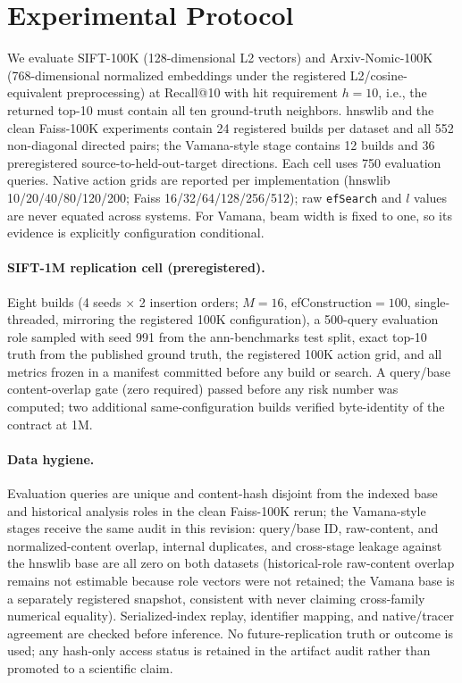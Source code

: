 \documentclass{article}
\begin{document}
\section{Experimental Protocol}
\label{sec:protocol}

We evaluate SIFT-100K (128-dimensional L2 vectors) and Arxiv-Nomic-100K (768-dimensional normalized
embeddings under the registered L2/cosine-equivalent preprocessing) at Recall@10 with hit requirement
$h=10$, i.e., the returned top-10 must contain all ten ground-truth neighbors. hnswlib and the clean
Faiss-100K experiments contain 24 registered builds per dataset and all 552 non-diagonal directed pairs;
the Vamana-style stage contains 12 builds and 36 preregistered source-to-held-out-target directions. Each
cell uses 750 evaluation queries. Native action grids are reported per implementation (hnswlib
10/20/40/80/120/200; Faiss 16/32/64/128/256/512); raw \texttt{efSearch} and $l$ values are never equated
across systems. For Vamana, beam width is fixed to one, so its evidence is explicitly configuration
conditional.

\paragraph{SIFT-1M replication cell (preregistered).}
Eight builds (4 seeds $\times$ 2 insertion orders; $M{=}16$, efConstruction${}=100$, single-threaded,
mirroring the registered 100K configuration), a 500-query evaluation role sampled with seed 991 from the
ann-benchmarks test split, exact top-10 truth from the published ground truth, the registered 100K action
grid, and all metrics frozen in a manifest committed before any build or search. A query/base
content-overlap gate (zero required) passed before any risk number was computed; two additional
same-configuration builds verified byte-identity of the contract at 1M.

\paragraph{Data hygiene.}
Evaluation queries are unique and content-hash disjoint from the indexed base and historical analysis roles
in the clean Faiss-100K rerun; the Vamana-style stages receive the same audit in this revision: query/base
ID, raw-content, and normalized-content overlap, internal duplicates, and cross-stage leakage against the
hnswlib base are all zero on both datasets (historical-role raw-content overlap remains not estimable
because role vectors were not retained; the Vamana base is a separately registered snapshot, consistent
with never claiming cross-family numerical equality). Serialized-index replay, identifier mapping, and
native/tracer agreement are checked before inference. No future-replication truth or outcome is used; any
hash-only access status is retained in the artifact audit rather than promoted to a scientific claim.
\end{document}
